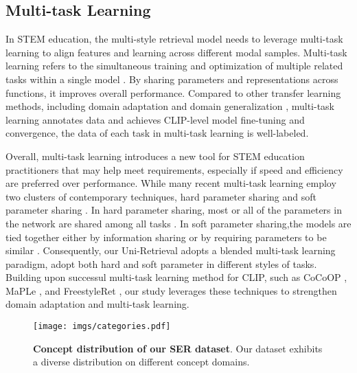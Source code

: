 \subsection{Multi-task Learning}

In STEM education, the multi-style retrieval model needs to leverage multi-task learning to align features and learning across different modal samples. Multi-task learning refers to the simultaneous training and optimization of multiple related tasks within a single model \cite{9392366}. By sharing parameters and representations across functions, it improves overall performance. Compared to other transfer learning methods, including domain adaptation \cite{farahani2021brief} and domain generalization \cite{zhou2022domain}, multi-task learning annotates data and achieves CLIP-level model fine-tuning and convergence, the data of each task in multi-task learning is well-labeled. 

Overall, multi-task learning introduces a new tool for STEM education practitioners that may help meet requirements, especially if speed and efficiency are preferred over performance. While many recent multi-task learning employ two clusters of contemporary techniques, hard parameter sharing and soft parameter sharing \cite{ruder2017overview}. In hard parameter sharing, most or all of the parameters in the network are shared among all tasks \cite{kokkinos2017ubernet}. In soft parameter sharing,the models are tied together either by information sharing or by requiring parameters to be similar \cite{yang2016trace}. Consequently, our Uni-Retrieval adopts a blended multi-task learning paradigm, adopt both hard and soft  parameter in different styles of tasks. Building upon successul multi-task learning method for CLIP, such as CoCoOP \cite{zhou2022conditional}, MaPLe \cite{khattak2023maple}, and FreestyleRet \cite{li2025freestyleret}, our study leverages these techniques to strengthen domain adaptation and multi-task learning. 

\begin{figure*}[!t]
  \centering
   \texttt{[image: imgs/categories.pdf]}
   \vspace{-6mm}
   \caption{\textbf{Concept distribution of our SER dataset}. Our dataset exhibits a diverse distribution on different concept domains.}
   \label{fig:distribution}
   \vspace{-3mm}
\end{figure*}

